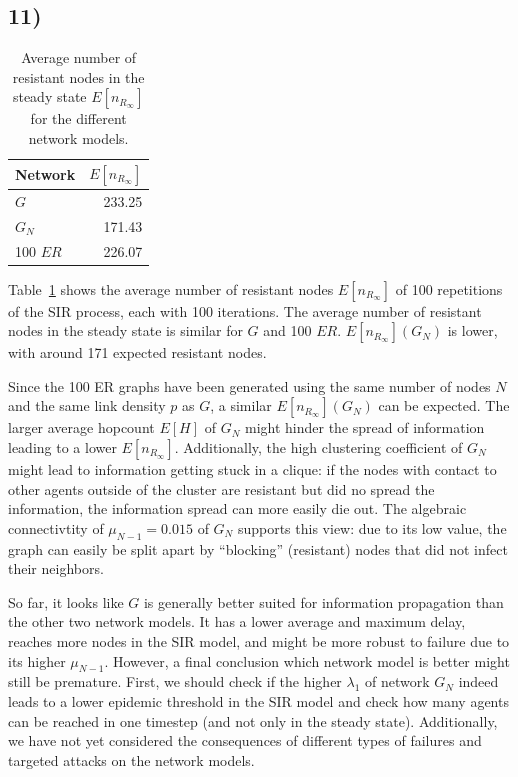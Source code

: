 \documentclass{article}
\begin{document}
\subsection*{11)}


\begin{table}[H]
  \centering
  \begin{tabular}{lr}
    \toprule
    Network    & $E[n_{R_\infty}]$ \\
    \midrule
    $G$      & 233.25            \\
    $G_N$    & 171.43            \\
    100 $ER$ & 226.07            \\
    \bottomrule
  \end{tabular}
  \caption{Average number of resistant nodes in
    the steady state $E[n_{R_\infty}]$ for the different network models.}
  \label{tab:steady}
\end{table}

Table~\ref{tab:steady} shows the average number of resistant nodes
$E[n_{R_\infty}]$ of 100 repetitions of the SIR process, each with 100
iterations. The average number of resistant nodes in the steady state
is similar for $G$ and 100 $ER$. $E[n_{R_\infty}](G_N)$ is lower, with
around 171 expected resistant nodes.

Since the 100 ER graphs have been generated using the same number of
nodes $N$ and the same link density $p$ as $G$, a similar
$E[n_{R_\infty}](G_N)$ can be expected. The larger average hopcount
$E[H]$ of $G_N$ might hinder the spread of information leading to a
lower $E[n_{R_\infty}]$. Additionally, the high clustering coefficient
of $G_N$ might lead to information getting stuck in a clique: if the
nodes with contact to other agents outside of the cluster are
resistant but did no spread the information, the information spread
can more easily die out. The algebraic connectivtity of $\mu_{N-1} =
0.015$ of $G_N$ supports this view: due to its low value, the graph
can easily be split apart by ``blocking'' (resistant) nodes that did
not infect their neighbors.
 
So far, it looks like $G$ is generally better suited for information
propagation than the other two network models. It has a lower average
and maximum delay, reaches more nodes in the SIR model, and might be
more robust to failure due to its higher $\mu_{N-1}$.  However, a
final conclusion which network model is better might still be
premature. First, we should check if the higher $\lambda_1$ of network
$G_N$ indeed leads to a lower epidemic threshold in the SIR model and
check how many agents can be reached in one timestep (and not only in
the steady state). Additionally, we have not yet considered the
consequences of different types of failures and targeted attacks on
the network models.
\end{document}
